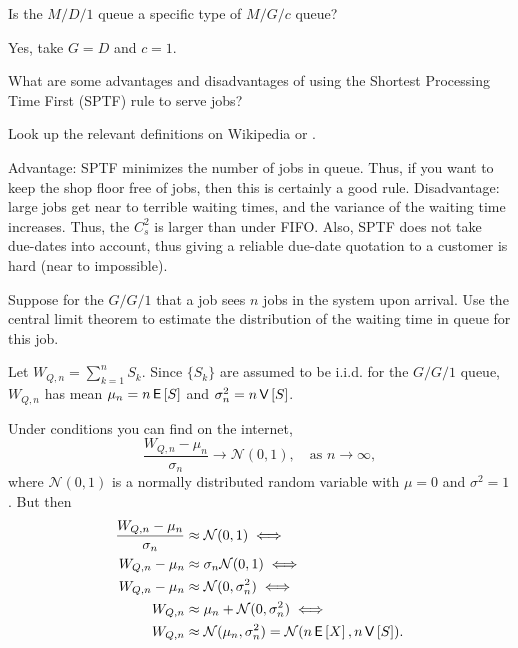 \begin{exercise}
  Is the $M/D/1$ queue a specific type of  $M/G/c$ queue? 
  \begin{solution}
    Yes, take $G=D$ and $c=1$. 
  \end{solution}
\end{exercise}

\begin{exercise}
  What are some advantages and disadvantages of using the Shortest Processing Time First (SPTF) rule to serve jobs?
  \begin{hint}
Look up the relevant
  definitions on Wikipedia or
  \citet{hall91:_queuein_method_servic_manuf}.
  \end{hint}
  \begin{solution}
    Advantage: SPTF minimizes the number of jobs in queue.
    Thus, if you want to keep the shop floor free of jobs, then this is certainly a good rule.
    Disadvantage: large jobs get near to terrible waiting times, and the variance of the waiting time increases.
    Thus, the $C_s^2$ is larger than under FIFO.
    Also, SPTF does not take due-dates into account, thus giving a reliable due-date quotation to a customer is hard (near to impossible).
  \end{solution}
\end{exercise}


\begin{exercise}
  Suppose for the $G/G/1$ that a job sees $n$ jobs in the system upon arrival.
  Use the central limit theorem to estimate the distribution of the waiting time in queue for this job.
  \begin{hint}
    Let $W_{Q,n} = \sum_{k=1}^n S_k$.
    Since $\{S_k\}$ are assumed to be i.i.d.
    for the $G/G/1$ queue,  $W_{Q,n}$ has mean $\mu_n = n \,\mathsf{E}\left[S\right]$ and $\sigma_n^2 = n\,\mathsf{V}\left[S\right]$.
  \end{hint}
  \begin{solution} Under conditions you can find on the internet,
    \begin{equation*}
    \frac{W_{Q,n} - \mu_n}{\sigma_n} \to \mathcal{N}(0,1), \quad\text{as } n\to \infty,
    \end{equation*}
    where $\mathcal{N}(0,1)$ is a normally distributed random variable
    with $\mu=0$ and $\sigma^2=1$. But then 
    \begin{align*}
    \frac{W_{Q,n} - \mu_n}{\sigma_n} &\approx  \mathcal{N}(0,1)  \iff\\
    W_{Q,n} - \mu_n &\approx  \sigma_n \mathcal{N}(0,1)  \iff\\
    W_{Q,n} - \mu_n &\approx  \mathcal{N}(0,\sigma_n^2)  \iff\\
    W_{Q,n}  &\approx   \mu_n  + \mathcal{N}(0,\sigma_n^2)  \iff\\
    W_{Q,n}  &\approx    \mathcal{N}(\mu_n,\sigma_n^2) = \mathcal{N}(n\,\mathsf{E}\left[X\right], n \,\mathsf{V}\left[S\right]).
    \end{align*}
\end{solution}
\end{exercise}


